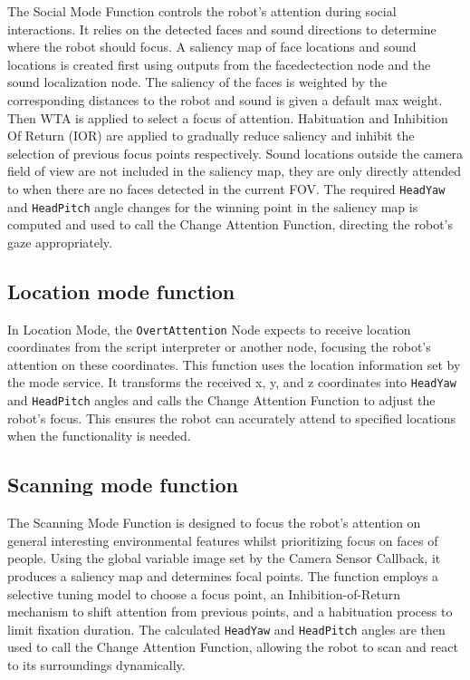 \documentclass{CSSRforAfrica}
\begin{document}
The Social Mode Function controls the robot's attention during social interactions. It relies on the detected faces and sound directions to determine where the robot should focus. A saliency map of face locations and sound locations is created first using outputs from the facedectection node and the sound localization node. The saliency of the faces is weighted by the corresponding distances to the robot and sound is given a default max weight. Then WTA is applied to select a focus of attention. Habituation and Inhibition Of Return (IOR) are applied to gradually reduce saliency and inhibit the selection of previous focus points respectively. Sound locations outside the camera field of view are not included in the saliency map, they are only directly attended to when there are no faces detected in the current FOV. The required \texttt{HeadYaw} and \texttt{HeadPitch} angle changes for the winning point in the saliency map is computed and used to call the Change Attention Function, directing the robot's gaze appropriately.

\subsection{Location mode function}

In Location Mode, the \texttt{OvertAttention} Node expects to receive location coordinates from the script interpreter or another node, focusing the robot's attention on these coordinates. This function uses the location information set by the mode service. It transforms the received x, y, and z coordinates into \texttt{HeadYaw} and \texttt{HeadPitch} angles and calls the Change Attention Function to adjust the robot's focus. This ensures the robot can accurately attend to specified locations when the functionality is needed.

\subsection{Scanning mode function}

The Scanning Mode Function is designed to focus the robot's attention on general interesting environmental features whilst prioritizing focus on faces of people. Using the global variable image set by the Camera Sensor Callback, it produces a saliency map and determines focal points. The function employs a selective tuning model to choose a focus point, an Inhibition-of-Return mechanism to shift attention from previous points, and a habituation process to limit fixation duration. The calculated  \texttt{HeadYaw} and \texttt{HeadPitch} angles are then used to call the Change Attention Function, allowing the robot to scan and react to its surroundings dynamically.
\end{document}
